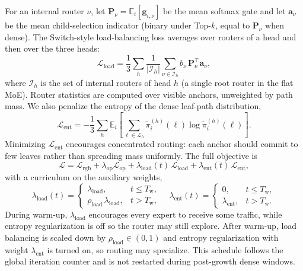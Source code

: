 For an internal router $\nu$, let $\mathbf{P}_{\nu}=\mathbb{E}_{i}[\mathbf{g}_{i,\nu}]$ be the mean softmax gate
and let $\mathbf{a}_{\nu}$ be the mean child-selection indicator (binary under Top-$k$, equal to $\mathbf{P}_{\nu}$ when dense).
The Switch-style load-balancing loss averages over routers of a head and then over the three heads:
\begin{equation}
\mathcal{L}_{\mathrm{load}}
=
\frac{1}{3}\sum_{h}
\frac{1}{|\mathcal{I}_{h}|}
\sum_{\nu\in\mathcal{I}_{h}}
b_{\nu}\,
\mathbf{P}_{\nu}^{\top}\mathbf{a}_{\nu},
\label{eq:load-loss}
\end{equation}
where $\mathcal{I}_{h}$ is the set of internal routers of head $h$ (a single root router in the flat MoE).
Router statistics are computed over visible anchors, unweighted by path mass.
We also penalize the entropy of the dense leaf-path distribution,
\begin{equation}
\mathcal{L}_{\mathrm{ent}}
=
-\frac{1}{3}\sum_{h}
\mathbb{E}_{i}
\left[
\sum_{\ell\in\mathcal{L}_{h}}
\tilde{\pi}_{i}^{(h)}(\ell)
\log\tilde{\pi}_{i}^{(h)}(\ell)
\right].
\label{eq:entropy-loss}
\end{equation}
Minimizing $\mathcal{L}_{\mathrm{ent}}$ encourages concentrated routing: each anchor should commit to few leaves rather than spreading mass uniformly.
The full objective is
\begin{equation}
\mathcal{L}
=
\mathcal{L}_{\mathrm{rgb}}
+\lambda_{\mathrm{op}}\mathcal{L}_{\mathrm{op}}
+\lambda_{\mathrm{load}}(t)\,\mathcal{L}_{\mathrm{load}}
+\lambda_{\mathrm{ent}}(t)\,\mathcal{L}_{\mathrm{ent}},
\label{eq:total-loss}
\end{equation}
with a curriculum on the auxiliary weights,
\begin{equation}
\lambda_{\mathrm{load}}(t)
=
\begin{cases}
\lambda_{\mathrm{load}}, & t\le T_{\mathrm{w}},\\
\rho_{\mathrm{load}}\,\lambda_{\mathrm{load}}, & t>T_{\mathrm{w}},
\end{cases}
\quad
\lambda_{\mathrm{ent}}(t)
=
\begin{cases}
0, & t\le T_{\mathrm{w}},\\
\lambda_{\mathrm{ent}}, & t>T_{\mathrm{w}}.
\end{cases}
\label{eq:loss-schedule}
\end{equation}
During warm-up, $\lambda_{\mathrm{load}}$ encourages every expert to receive some traffic, while entropy regularization is off so the router may still explore.
After warm-up, load balancing is scaled down by $\rho_{\mathrm{load}}\in(0,1)$ and entropy regularization with weight $\lambda_{\mathrm{ent}}$ is turned on, so routing may specialize.
This schedule follows the global iteration counter and is not restarted during post-growth dense windows.

